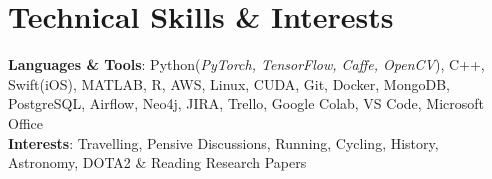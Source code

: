 \documentclass[letterpaper,11pt]{article}
\begin{document}
%
\section{Technical Skills \& Interests}
 \begin{itemize}[leftmargin=0.15in, label={}]
    \small{\item{
     \textbf{Languages \& Tools}{: Python(\textit{PyTorch, TensorFlow, Caffe, OpenCV}), C++, Swift(iOS), MATLAB, R, AWS, Linux, CUDA, Git, Docker, MongoDB, PostgreSQL, Airflow, Neo4j, JIRA, Trello, Google Colab, VS Code, Microsoft Office}} \\
     \textbf{Interests}{: Travelling, Pensive Discussions, Running, Cycling, History, Astronomy,  DOTA2 \& Reading Research Papers}
     }
 \end{itemize}


\end{document}
